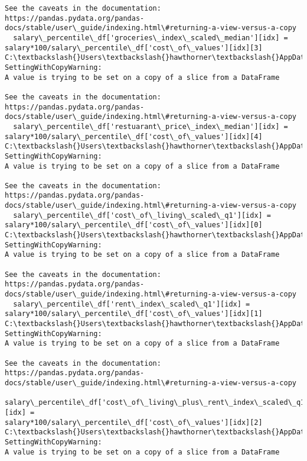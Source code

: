 \documentclass[11pt]{article}
\begin{document}
\begin{Verbatim}[commandchars=\\\{\}]
See the caveats in the documentation: https://pandas.pydata.org/pandas-
docs/stable/user\_guide/indexing.html\#returning-a-view-versus-a-copy
  salary\_percentile\_df['groceries\_index\_scaled\_median'][idx] =
salary*100/salary\_percentile\_df['cost\_of\_values'][idx][3]
C:\textbackslash{}Users\textbackslash{}hawthorner\textbackslash{}AppData\textbackslash{}Local\textbackslash{}Temp\textbackslash{}ipykernel\_22188\textbackslash{}773068333.py:41:
SettingWithCopyWarning:
A value is trying to be set on a copy of a slice from a DataFrame

See the caveats in the documentation: https://pandas.pydata.org/pandas-
docs/stable/user\_guide/indexing.html\#returning-a-view-versus-a-copy
  salary\_percentile\_df['restuarant\_price\_index\_median'][idx] =
salary*100/salary\_percentile\_df['cost\_of\_values'][idx][4]
C:\textbackslash{}Users\textbackslash{}hawthorner\textbackslash{}AppData\textbackslash{}Local\textbackslash{}Temp\textbackslash{}ipykernel\_22188\textbackslash{}773068333.py:44:
SettingWithCopyWarning:
A value is trying to be set on a copy of a slice from a DataFrame

See the caveats in the documentation: https://pandas.pydata.org/pandas-
docs/stable/user\_guide/indexing.html\#returning-a-view-versus-a-copy
  salary\_percentile\_df['cost\_of\_living\_scaled\_q1'][idx] =
salary*100/salary\_percentile\_df['cost\_of\_values'][idx][0]
C:\textbackslash{}Users\textbackslash{}hawthorner\textbackslash{}AppData\textbackslash{}Local\textbackslash{}Temp\textbackslash{}ipykernel\_22188\textbackslash{}773068333.py:45:
SettingWithCopyWarning:
A value is trying to be set on a copy of a slice from a DataFrame

See the caveats in the documentation: https://pandas.pydata.org/pandas-
docs/stable/user\_guide/indexing.html\#returning-a-view-versus-a-copy
  salary\_percentile\_df['rent\_index\_scaled\_q1'][idx] =
salary*100/salary\_percentile\_df['cost\_of\_values'][idx][1]
C:\textbackslash{}Users\textbackslash{}hawthorner\textbackslash{}AppData\textbackslash{}Local\textbackslash{}Temp\textbackslash{}ipykernel\_22188\textbackslash{}773068333.py:46:
SettingWithCopyWarning:
A value is trying to be set on a copy of a slice from a DataFrame

See the caveats in the documentation: https://pandas.pydata.org/pandas-
docs/stable/user\_guide/indexing.html\#returning-a-view-versus-a-copy
  salary\_percentile\_df['cost\_of\_living\_plus\_rent\_index\_scaled\_q1'][idx] =
salary*100/salary\_percentile\_df['cost\_of\_values'][idx][2]
C:\textbackslash{}Users\textbackslash{}hawthorner\textbackslash{}AppData\textbackslash{}Local\textbackslash{}Temp\textbackslash{}ipykernel\_22188\textbackslash{}773068333.py:47:
SettingWithCopyWarning:
A value is trying to be set on a copy of a slice from a DataFrame


\end{Verbatim}
\end{document}
